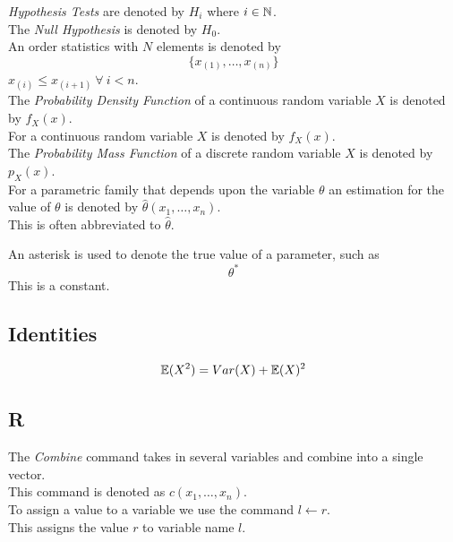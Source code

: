 \documentclass[11pt,a4paper]{article}
\begin{document}
\textit{Hypothesis Tests} are denoted by $H_i$ where $i\in\mathbb{N}$.\\
The \textit{Null Hypothesis} is denoted by $H_0$.\\

An order statistics with $N$ elements is denoted by
$$\{x_{(1)},\dots,x_{(n)}\}$$
$x_{(i)}\leq x_{(i+1)}\ \forall\ i<n$.\\

The \textit{Probability Density Function} of a continuous random variable $X$ is denoted by $f_X(x)$.\\

For a continuous random variable $X$ is denoted by $f_X(x)$.\\

The \textit{Probability Mass Function} of a discrete random variable $X$ is denoted by $p_X(x)$.\\

For a parametric family that depends upon the variable $\theta$ an estimation for the value of $\theta$ is denoted by $\hat{\theta}(x_1,\dots,x_n)$.\\
\nb This is often abbreviated to $\hat{\theta}$.

An asterisk is used to denote the true value of a parameter, such as
$$\theta^*$$ 
\nb This is a constant.\\

\subsection{Identities}

$$\mathbb{E}(X^2)=Var(X)+\mathbb{E}(X)^2$$

\subsection{R}

The \textit{Combine} command takes in several variables and combine into a single vector.\\
This command is denoted as $c(x_1, \dots,x_n)$.\\

To assign a value to a variable we use the command $l\leftarrow r$.\\
This assigns the value $r$ to variable name $l$.\\
\end{document}
